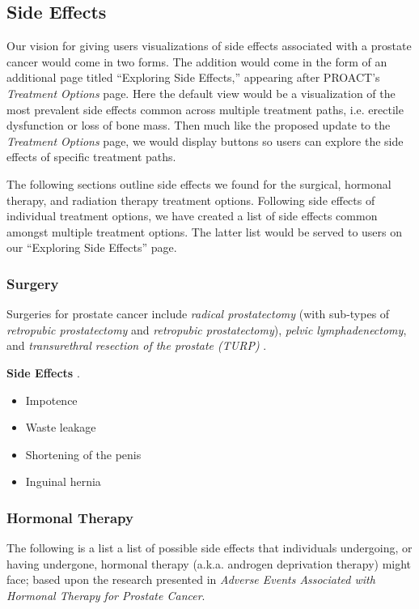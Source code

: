 \documentclass[journal]{vgtc}                %
\begin{document}
        \subsection{Side Effects}
                Our vision for giving users visualizations of side effects associated with a prostate cancer would come in two forms.
                The addition would come in the form of an additional page titled ``Exploring Side Effects,'' appearing after PROACT's \textit{Treatment Options} page.
                Here the default view would be a visualization of the most prevalent side effects common across multiple treatment paths, i.e. erectile dysfunction or loss of bone mass.
                Then much like the proposed update to the \textit{Treatment Options} page, we would display buttons so users can explore the side effects of specific treatment paths.

                The following sections outline side effects we found for the surgical, hormonal therapy, and radiation therapy treatment options.
                Following side effects of individual treatment options, we have created a list of side effects common amongst multiple treatment options.
                The latter list would be served to users on our ``Exploring Side Effects'' page.

                \subsubsection{Surgery}
                        Surgeries for prostate cancer include \textit{radical prostatectomy} (with sub-types of \textit{retropubic prostatectomy} and \textit{retropubic prostatectomy}), \textit{pelvic lymphadenectomy}, and \textit{transurethral resection of the prostate (TURP)} \cite{PDQProstateCancer:2016}.

                        \textbf{Side Effects} \cite{PDQProstateCancer:2016}.
                        \begin{itemize}
                            \item {Impotence}
                            \item {Waste leakage}
                            \item {Shortening of the penis}
                            \item {Inguinal hernia}
                        \end{itemize}

                \subsubsection{Hormonal Therapy}
                        The following is a list a list of possible side effects that individuals undergoing, or having undergone, hormonal therapy (a.k.a. androgen deprivation therapy) might face;  based upon the research presented in \textit{Adverse Events Associated with Hormonal Therapy for Prostate Cancer}\cite{AdverseEvents:2005}.
                        \newline
\end{document}
